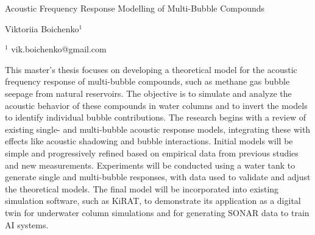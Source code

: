         
        
       


\Large
 \begin{center}
    Acoustic Frequency Response Modelling of Multi-Bubble Compounds

\hspace{10pt}

\large
Viktoriia Boichenko$^1$ \\

\hspace{10pt}

\small  
$^1$ vik.boichenko@gmail.com\\

\end{center}

\hspace{10pt}

\normalsize

This master's thesis focuses on developing a theoretical model for the acoustic frequency response of multi-bubble compounds, such as methane gas bubble seepage from natural reservoirs. The objective is to simulate and analyze the acoustic behavior of these compounds in water columns and to invert the models to identify individual bubble contributions. The research begins with a review of existing single- and multi-bubble acoustic response models, integrating these with effects like acoustic shadowing and bubble interactions. Initial models will be simple and progressively refined based on empirical data from previous studies and new measurements. Experiments will be conducted using a water tank to generate single and multi-bubble responses, with data used to validate and adjust the theoretical models. The final model will be incorporated into existing simulation software, such as KiRAT, to demonstrate its application as a digital twin for underwater column simulations and for generating SONAR data to train AI systems.